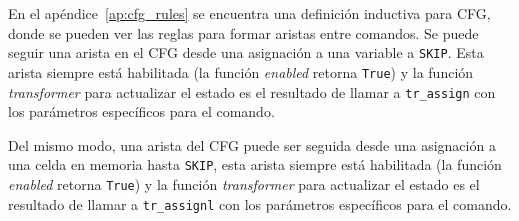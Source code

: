 En el apéndice~\ref{ap:cfg_rules} se encuentra una definición inductiva para CFG, donde se pueden ver las reglas para formar aristas entre comandos.
Se puede seguir una arista en el CFG desde una asignación a una variable a \verb|SKIP|.
Esta arista siempre está habilitada (la función \textit{enabled} retorna \verb|True|) y la función \textit{transformer} para actualizar el estado es el resultado de llamar a \verb|tr_assign| con los parámetros específicos para el comando.

\begin{comment}

Pasado a apéndices

\begin{figure} 
  \begin{lstlisting}[frame=single, mathescape=true]
  type_synonym cfg_label = enabled $\times$ transformer

  inductive cfg :: com $\Rightarrow$ cfg_label $\Rightarrow$ com $\Rightarrow$ bool where

    Assign: cfg ($x$ ::= $a$) (en_always,tr_assign $x$ $a$) SKIP
  | Assignl: cfg ($x$ ::==  $a$) (en_always,tr_assignl $x$ $a$) SKIP
  | Seq1: cfg (SKIP;; $c_{2}$) (en_always, tr_id) $c_{2}$
  | Seq2: $[\![$cfg $c_{1}$ $a$ $c_{1}'$ $]\!]$ $\Longrightarrow$ cfg ($c_{1}$;; $c_{2}$) $a$ ($c_{1}'$;; $c_{2}$)
  | IfTrue: cfg (IF $b$ THEN $c_{1}$ ELSE $c_{2}$) (en_pos $b$, tr_eval $b$) $c_{1}$
  | IfFalse: cfg (IF $b$ THEN $c_{1}$ ELSE $c_{2}$) (en_neg $b$, tr_eval $b$) $c_{2}$
  | While: cfg (WHILE $b$ DO $c$) (en_always, tr_id)
      (IF $b$ THEN $c$;; WHILE $b$ DO $c$ ELSE SKIP)
  | Free: cfg (FREE $x$) (en_always, tr_free $x$) SKIP

  | Return: cfg (Return $a$) (en_always, tr_return $a$) SKIP
  | Returnv: cfg Returnv (en_always, tr_return_void) SKIP

  | Callfunl: cfg (Callfunl $e$ $f$ params)
      (en_always, tr_callfunl proc_table $e$ $f$ params) SKIP
  | Callfun: cfg (Callfun $x$ $f$ params)
      (en_always, tr_callfun proc_table $x$ $f$ params) SKIP
  | Callfunv: cfg (Callfunv $f$ params)
      (en_always, tr_callfunv proc_table $f$ params) SKIP
  \end{lstlisting}

  \caption{Reglas del CFG}
  \label{fig:cfg_rules}
\end{figure}

\end{comment}

Del mismo modo, una arista del CFG puede ser seguida desde una asignación a una celda en memoria hasta \verb|SKIP|, esta arista siempre está habilitada (la función \textit{enabled} retorna \verb|True|) y la función \textit{transformer} para actualizar el estado es el resultado de llamar a \verb|tr_assignl| con los parámetros específicos para el comando.

